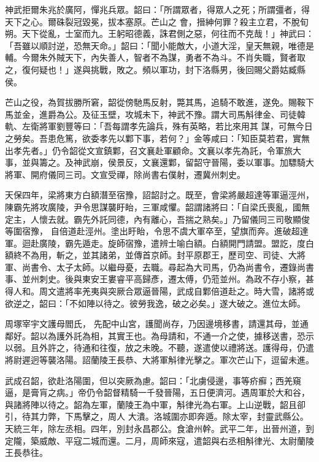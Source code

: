\begin{pinyinscope}
 神武拒爾朱兆於廣阿，憚兆兵眾。韶曰：「所謂眾者，得眾人之死；所謂彊者，得天下之心。爾硃裂冠毀冕，拔本塞原。芒山之
 會，搢紳何罪？殺主立君，不脫旬朔。天下從亂，士室而九。王躬昭德義，誅君側之惡，何往而不克哉！」神武曰：「吾雖以順討逆，恐無天命。」韶曰：「聞小能敵大，小道大淫，皇天無親，唯德是輔。今爾朱外賊天下，內失善人，智者不為謀，勇者不為斗。不肖失職，賢者取之，復何疑也！」遂與挑戰，敗之。頻以軍功，封下洛縣男，後回賜父爵姑臧縣侯。



 芒山之役，為賀拔勝所窘，韶從傍馳馬反射，斃其馬，追騎不敢進，遂免。賜鞍下馬並金，進爵為公。及征玉壁，攻城未下，神武不豫。謂大司馬斛律金、司徒韓軌、左衛將軍劉豐等曰：「吾每謂孝先論兵，殊有英略，若比來用其
 謀，可無今日之勞矣。吾患危篤，欲委孝先以鄴下事，若何？」金等咸曰：「知臣莫若君，實無出孝先者。」仍令韶從文宣鎮鄴，召文襄赴軍顧命。文襄以孝先為託，令軍旅大事，並與籌之。及神武崩，侯景反，文襄還鄴，留韶守晉陽，委以軍事。加驃騎大將軍、開府儀同三司。文宣受禪，除尚書右僕射，遷冀州刺史。



 天保四年，梁將東方白額潛至宿豫，詔韶討之。既至，會梁將嚴超達等軍逼涇州，陳霸先將攻廣陵，尹令思謀襲盱眙，三軍咸懼。韶謂諸將曰：「自梁氏喪亂，國無定主，人懷去就。霸先外託同德，內有離心，吾揣之熟矣。」乃留儀同三司敬顯俊等圍宿豫，
 自倍道赴涇州。塗出盱眙，令思不虞大軍卒至，望旗而奔。進破超達軍。迴赴廣陵，霸先遁走。旋師宿豫，遣辨士喻白額。白額開門請盟。盟訖，度白額終不為用，斬之，並其諸弟，並傳首京師。封平原郡王，歷司空、司徒、大將軍、尚書令、太子太師。以繼母憂，去職。尋起為大司馬，仍為尚書令，遷錄尚書事、並州刺史。後與東安王婁睿平高歸彥，遷太傅，仍蒞並州。為政不存小察，甚得人和。周文遣將率羌夷與突厥合眾逼晉陽，武成自鄴倍道赴之。時大雪，諸將或欲逆之，韶曰：「不如陣以待之。彼勞我逸，破之必矣。」遂大破之。進位太師。



 周塚宰宇文護母閻氏，
 先配中山宮，護聞尚存，乃因邊境移書，請還其母，並通鄰好。韶以為護外託為相，其實王也。為母請和，不通一介之使，據移送書，恐示以弱。且外許之，待通和往復，放之未晚。不聽，遂遣使以禮將送。護得母，仍遣將尉遲迥等襲洛陽。詔蘭陵王長恭、大將軍斛律光擊之。軍次芒山下，逗留未進。



 武成召韶，欲赴洛陽圍，但以突厥為慮。韶曰：「北虜侵邊，事等疥癬；西羌窺逼，是膏肓之病。」帝仍令韶督精騎一千發晉陽，五日便濟河。遇周軍於大和谷，與諸將陣以待之。韶為左軍，蘭陵王為中軍，斛律光為右軍。上山逆戰，韶且卻引，待其力弊，下馬擊之，周人
 大潰。洛城圍亦即奔遁。除太宰，封靈武縣公。天統三年，除左丞相。四年，別封永昌郡公。食滄州幹。武平二年，出晉州道，到定隴，築威敵、平寇二城而還。二月，周師來寇，遣韶與右丞相斛律光、太尉蘭陵王長恭往。




\end{pinyinscope}
